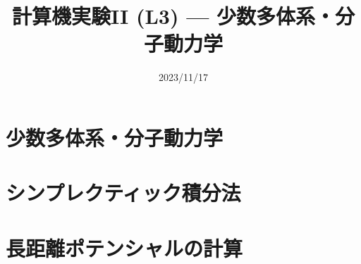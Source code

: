\documentclass[10pt,dvipdfmx]{beamer}
\title{計算機実験II (L3) --- 少数多体系・分子動力学}
\date{2023/11/17}
\begin{document}
\begin{frame}
  \titlepage
  \tableofcontents
\end{frame}



\section{少数多体系・分子動力学}



%
%






\section{シンプレクティック積分法}
















%
%

\section{長距離ポテンシャルの計算}
\end{document}
